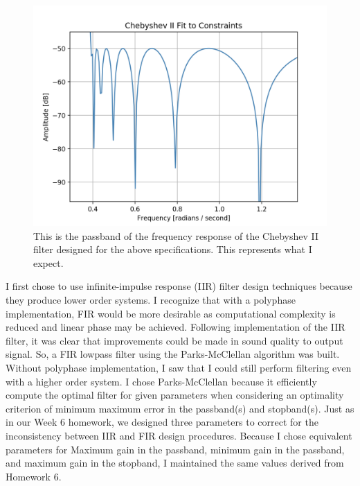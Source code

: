 \documentclass{article}
\begin{document}
\begin{figure}[h] \label{fig:chebII}
    \centering
    \includegraphics[width=.5\textwidth]{kaiser_3.png}
    \caption{This is the passband of the frequency response of the Chebyshev II filter designed for the above specifications. This represents what I expect.}
\end{figure}

I first chose to use infinite-impulse response (IIR) filter design techniques because they produce lower order systems. I recognize that with a polyphase implementation, FIR would be more desirable as computational complexity is reduced and linear phase may be achieved. Following implementation of the IIR filter, it was clear that improvements could be made in sound quality to output signal. So, a FIR lowpass filter using the Parks-McClellan algorithm was built. Without polyphase implementation, I saw that I could still perform filtering even with a higher order system. I chose Parks-McClellan because it efficiently compute the optimal filter for given parameters when considering an optimality criterion of minimum maximum error in the passband(s) and stopband(s). Just as in our Week 6 homework, we designed three parameters to correct for the inconsistency between IIR and FIR design procedures. Because I chose equivalent parameters for Maximum gain in the passband, minimum gain in the passband, and maximum gain in the stopband, I maintained the same values derived from Homework 6.
\end{document}
